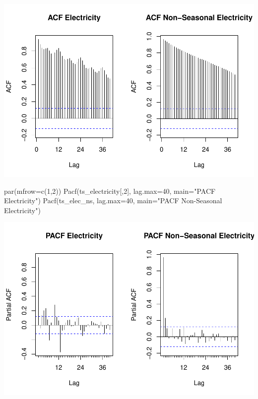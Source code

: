 \documentclass[
]{article}
\newenvironment{Shaded}{\begin{snugshade}}{\end{snugshade}}
\newcommand{\AttributeTok}[1]{\textcolor[rgb]{0.77,0.63,0.00}{#1}}
\newcommand{\DecValTok}[1]{\textcolor[rgb]{0.00,0.00,0.81}{#1}}
\newcommand{\FunctionTok}[1]{\textcolor[rgb]{0.00,0.00,0.00}{#1}}
\newcommand{\NormalTok}[1]{#1}
\newcommand{\StringTok}[1]{\textcolor[rgb]{0.31,0.60,0.02}{#1}}
\begin{document}
\includegraphics{Final-Project_files/figure-latex/unnamed-chunk-6-1.pdf}

\begin{Shaded}
\begin{Highlighting}[]
\FunctionTok{par}\NormalTok{(}\AttributeTok{mfrow=}\FunctionTok{c}\NormalTok{(}\DecValTok{1}\NormalTok{,}\DecValTok{2}\NormalTok{))}
\FunctionTok{Pacf}\NormalTok{(ts\_electricity[,}\DecValTok{2}\NormalTok{], }\AttributeTok{lag.max=}\DecValTok{40}\NormalTok{, }\AttributeTok{main=}\StringTok{"PACF Electricity"}\NormalTok{)}
\FunctionTok{Pacf}\NormalTok{(ts\_elec\_ns, }\AttributeTok{lag.max=}\DecValTok{40}\NormalTok{, }\AttributeTok{main=}\StringTok{"PACF Non{-}Seasonal Electricity"}\NormalTok{)}
\end{Highlighting}
\end{Shaded}

\includegraphics{Final-Project_files/figure-latex/unnamed-chunk-6-2.pdf}
\end{document}
